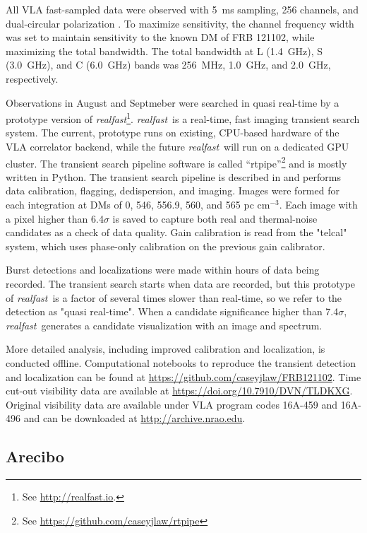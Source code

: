 \documentclass{emulateapj}
\newcommand{\rf}{\emph{realfast}}
\newcommand{\frb}{FRB 121102}
\begin{document}
All VLA fast-sampled data were observed with 5~ms sampling, 256 channels, and dual-circular polarization \citep[as in]{2015ApJ...807...16L}. To maximize sensitivity, the channel frequency width was set to maintain sensitivity to the known DM of \frb, while maximizing the total bandwidth. The total bandwidth at L (1.4~GHz), S (3.0~GHz), and C (6.0~GHz) bands was 256~MHz, 1.0~GHz, and 2.0~GHz, respectively.

Observations in August and Septmeber were searched in quasi real-time by a prototype version of \rf\footnote{See \url{http://realfast.io}.}. \rf\ is a real-time, fast imaging transient search system. The current, prototype runs on existing, CPU-based hardware of the VLA correlator backend, while the future \rf\ will run on a dedicated GPU cluster. The transient search pipeline software is called ``rtpipe''\footnote{See \url{https://github.com/caseyjlaw/rtpipe}} and is mostly written in Python. The transient search pipeline is described in \citet{2015ApJ...807...16L} and performs data calibration, flagging, dedispersion, and imaging. Images were formed for each integration at DMs of 0, 546, 556.9, 560, and 565 pc cm$^{-3}$. Each image with a pixel higher than 6.4$\sigma$ is saved to capture both real and thermal-noise candidates as a check of data quality. Gain calibration is read from the "telcal" system, which uses phase-only calibration on the previous gain calibrator.

Burst detections and localizations were made within hours of data being recorded. The transient search starts when data are recorded, but this prototype of \rf\ is a factor of several times slower than real-time, so we refer to the detection as "quasi real-time". When a candidate significance higher than 7.4$\sigma$, \rf\ generates a candidate visualization with an image and spectrum. 

More detailed analysis, including improved calibration and localization, is conducted offline. Computational notebooks to reproduce the transient detection and localization can be found at \url{https://github.com/caseyjlaw/FRB121102}. Time cut-out visibility data are available at \url{https://doi.org/10.7910/DVN/TLDKXG}. Original visibility data are available under VLA program codes 16A-459 and 16A-496 and can be downloaded at \url{http://archive.nrao.edu}.

\subsection{Arecibo}
\end{document}
